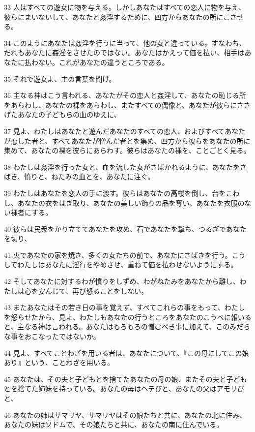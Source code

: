 \par 33 人はすべての遊女に物を与える。しかしあなたはすべての恋人に物を与え、彼らにまいないして、あなたと姦淫するために、四方からあなたの所にこさせる。
\par 34 このようにあなたは姦淫を行うに当って、他の女と違っている。すなわち、だれもあなたに姦淫をさせたのではない。あなたはかえって価を払い、相手はあなたに払わない。これがあなたの違うところである。
\par 35 それで遊女よ、主の言葉を聞け。
\par 36 主なる神はこう言われる、あなたがその恋人と姦淫して、あなたの恥じる所をあらわし、あなたの裸をあらわし、またすべての偶像と、あなたが彼らにささげたあなたの子どもらの血のゆえに、
\par 37 見よ、わたしはあなたと遊んだあなたのすべての恋人、およびすべてあなたが恋した者と、すべてあなたが憎んだ者とを集め、四方から彼らをあなたの所に集めて、あなたの裸を彼らにあらわす。彼らはあなたの裸を、ことごとく見る。
\par 38 わたしは姦淫を行った女と、血を流した女がさばかれるように、あなたをさばき、憤りと、ねたみの血とを、あなたに注ぐ。
\par 39 わたしはあなたを恋人の手に渡す。彼らはあなたの高楼を倒し、台をこわし、あなたの衣をはぎ取り、あなたの美しい飾りの品を奪い、あなたを衣服のない裸者にする。
\par 40 彼らは民衆をかり立ててあなたを攻め、石であなたを撃ち、つるぎであなたを切り、
\par 41 火であなたの家を焼き、多くの女たちの前で、あなたにさばきを行う。こうしてわたしはあなたに淫行をやめさせ、重ねて価を払わせないようにする。
\par 42 そしてあなたに対するわが憤りをしずめ、わがねたみをあなたから離し、わたしは心を安んじて、再び怒ることをしない。
\par 43 またあなたはその若き日の事を覚えず、すべてこれらの事をもって、わたしを怒らせたから、見よ、わたしもあなたの行うところをあなたのこうべに報いると、主なる神は言われる。あなたはもろもろの憎むべき事に加えて、このみだらな事をおこなったではないか。
\par 44 見よ、すべてことわざを用いる者は、あなたについて、『この母にしてこの娘あり』という、ことわざを用いる。
\par 45 あなたは、その夫と子どもとを捨てたあなたの母の娘、またその夫と子どもとを捨てた姉妹を持っている。あなたの母はヘテびと、あなたの父はアモリびと、
\par 46 あなたの姉はサマリヤ、サマリヤはその娘たちと共に、あなたの北に住み、あなたの妹はソドムで、その娘たちと共に、あなたの南に住んでいる。
